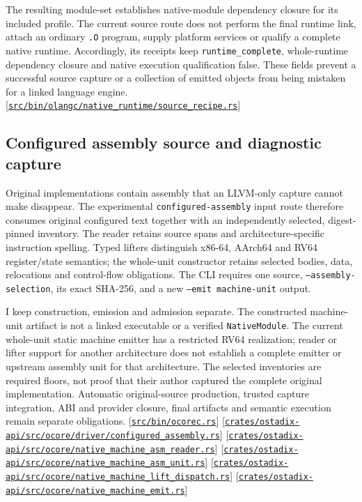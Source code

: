 \documentclass[11pt,oneside]{article}
\newcommand{\src}[1]{\textcolor{OSlate}{\scriptsize[\href{https://github.com/lostadi/OSTADIX/blob/c0b02c326b2329a95ba52447c7180bc93957cd57/#1}{\nolinkurl{#1}}]}\allowbreak}
\begin{document}
The resulting module-set establishes native-module dependency closure for its
included profile. The current source route does not perform the final runtime
link, attach an ordinary \texttt{.O} program, supply platform services or qualify
a complete native runtime. Accordingly, its receipts keep
\texttt{runtime\_complete}, whole-runtime dependency closure and native execution
qualification false. These fields prevent a successful source capture or a
collection of emitted objects from being mistaken for a linked language engine.
\src{src/bin/olangc/native_runtime/source_recipe.rs}

\subsection{Configured assembly source and diagnostic capture}

Original implementations contain assembly that an LLVM-only capture cannot
make disappear. The experimental \texttt{configured-assembly} input route
therefore consumes original configured text together with an independently
selected, digest-pinned inventory. The reader retains source spans and
architecture-specific instruction spelling. Typed lifters distinguish
x86-64, AArch64 and RV64 register/state semantics; the whole-unit constructor
retains selected bodies, data, relocations and control-flow obligations.
The CLI requires one source, \texttt{--assembly-selection}, its exact
SHA-256, and a new \texttt{--emit machine-unit} output.

I keep construction, emission and admission separate. The constructed
machine-unit artifact is not a linked executable or a verified
\texttt{NativeModule}. The current whole-unit static machine emitter has a
restricted RV64 realization; reader or lifter support for another
architecture does not establish a complete emitter or upstream assembly
unit for that architecture. The selected inventories are required floors,
not proof that their author captured the complete original implementation.
Automatic original-source production, trusted capture integration, ABI and
provider closure, final artifacts and semantic execution remain separate
obligations.
\src{src/bin/ocorec.rs}
\src{crates/ostadix-api/src/ocore/driver/configured_assembly.rs}
\src{crates/ostadix-api/src/ocore/native_machine_asm_reader.rs}
\src{crates/ostadix-api/src/ocore/native_machine_asm_unit.rs}
\src{crates/ostadix-api/src/ocore/native_machine_lift_dispatch.rs}
\src{crates/ostadix-api/src/ocore/native_machine_emit.rs}
\end{document}
